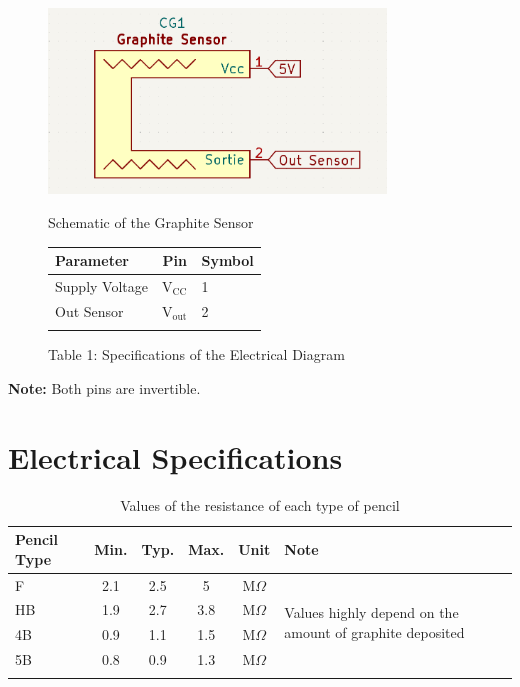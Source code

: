 \documentclass[10pt]{datasheet}
\begin{document}
\begin{figure}[h!]
    \begin{minipage}[ts]{.47\linewidth}
        \centering
        \captionsetup{justification=centering}
        \includegraphics[width=0.8\textwidth]{Cover/ElectricDiagramSensor.png}
        \caption{\small{Schematic of the Graphite Sensor}}
    \end{minipage}
    \begin{minipage}[b]{.45\linewidth}
        \centering
        \caption*{Table 1: Specifications of the Electrical Diagram}
            \begin{tabularx}{\textwidth}{l | c | X}
                \thickhline
                \textbf{Parameter} & \textbf{Pin} & \textbf{Symbol} \\
                \hline
                Supply Voltage & V$_{\text{CC}}$ & 1 \\ 
                \hline
                Out Sensor & V$_{\text{out}}$ & 2 \\
                \thickhline
            \end{tabularx}
    \end{minipage}
\end{figure}

\textbf{Note:} Both pins are invertible.

\setcounter{table}{1}

\section{Electrical Specifications}

\begin{table}[h]
\begin{threeparttable}
\caption{Values of the resistance of each type of pencil}
\begin{tabularx}{\textwidth}{l | c | c | c | c | X}
    \thickhline
    \textbf{Pencil Type} & \textbf{Min.} & \textbf{Typ.} & \textbf{Max.} &
    \textbf{Unit} & \textbf{Note} \\
    \hline
    F  & 2.1 & 2.5 & 5 & $\text{M}\Omega$ & \multirow{4}{*}{Values highly depend on the amount of graphite deposited} \\
    HB & 1.9 & 2.7 & 3.8 & $\text{M}\Omega$ &  \\
    4B & 0.9 & 1.1 & 1.5 & $\text{M}\Omega$ &  \\
    5B & 0.8 & 0.9 & 1.3 & $\text{M}\Omega$ &  \\
    \thickhline
\end{tabularx}
\end{threeparttable}
\end{table}
\end{document}
